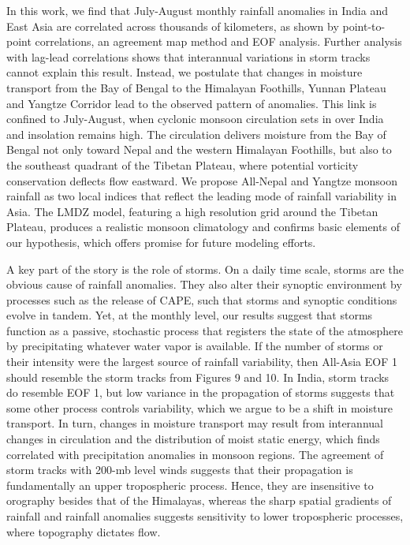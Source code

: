 \documentclass[12pt]{article}
\begin{document}
	In this work, we find that July-August monthly rainfall anomalies in India and East Asia are correlated across thousands of kilometers, as shown by point-to-point correlations, an agreement map method and EOF analysis. Further analysis with lag-lead correlations shows that interannual variations in storm tracks cannot explain this result. Instead, we postulate that changes in moisture transport from the Bay of Bengal to the Himalayan Foothills, Yunnan Plateau and Yangtze Corridor lead to the observed pattern of anomalies. This link is confined to July-August, when cyclonic monsoon circulation sets in over India and insolation remains high. The circulation delivers moisture from the Bay of Bengal not only toward Nepal and the western Himalayan Foothills, but also to the southeast quadrant of the Tibetan Plateau, where potential vorticity conservation deflects flow eastward. We propose All-Nepal and Yangtze monsoon rainfall as two local indices that reflect the leading mode of rainfall variability in Asia. The LMDZ model, featuring a high resolution grid around the Tibetan Plateau, produces a realistic monsoon climatology and confirms basic elements of our hypothesis, which offers promise for future modeling efforts.
	
	A key part of the story is the role of storms. On a daily time scale, storms are the obvious cause of rainfall anomalies. They also alter their synoptic environment by processes such as the release of CAPE, such that storms and synoptic conditions evolve in tandem. Yet, at the monthly level, our results suggest that storms function as a passive, stochastic process that registers the state of the atmosphere by precipitating whatever water vapor is available. If the number of storms or their intensity were the largest source of rainfall variability, then All-Asia EOF 1 should resemble the storm tracks from Figures 9 and 10. In India, storm tracks do resemble EOF 1, but low variance in the propagation of storms suggests that some other process controls variability, which we argue to be a shift in moisture transport. In turn, changes in moisture transport may result from interannual changes in circulation and the distribution of  moist static energy, which \cite{Hurley2013} finds correlated with precipitation anomalies in monsoon regions. The agreement of storm tracks with 200-mb level winds suggests that their propagation is fundamentally an upper tropospheric process. Hence, they are insensitive to orography besides that of the Himalayas, whereas the sharp spatial gradients of rainfall and rainfall anomalies suggests sensitivity to lower tropospheric processes, where topography dictates flow.
	
\end{document}
